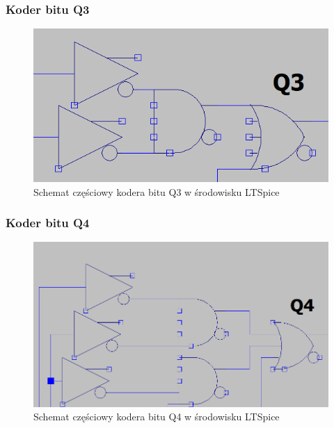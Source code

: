 \documentclass{article}
\begin{document}
\subsubsection{Koder bitu Q3}
\begin{figure}[H]
    \centering
    \begin{adjustbox}{center}
        \includegraphics[width=1\textwidth]{q3.png}
    \end{adjustbox}
    \caption{Schemat częściowy kodera bitu Q3 w środowisku LTSpice}
    \label{fig:mojobrazek}
\end{figure}

\subsubsection{Koder bitu Q4}
\begin{figure}[H]
    \centering
    \begin{adjustbox}{center}
        \includegraphics[width=1\textwidth]{q4.png}
    \end{adjustbox}
    \caption{Schemat częściowy kodera bitu Q4 w środowisku LTSpice}
    \label{fig:mojobrazek}
\end{figure}
\newpage
\end{document}
